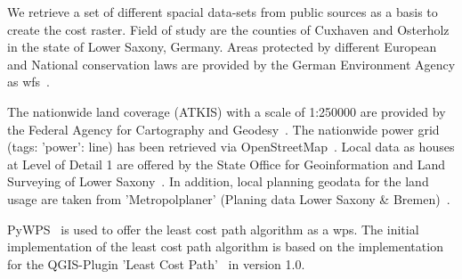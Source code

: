 
We retrieve a set of different spacial data-sets from  public sources as a basis to create the cost raster.
Field of study are the counties of Cuxhaven and Osterholz in the state of Lower Saxony, Germany.
Areas protected by different European and National conservation laws are provided by the German Environment Agency
as \acrfull{wfs}~\cite{noauthor_schutzgebiete_2015}.

The nationwide land coverage (ATKIS) with a scale of 1:250000 are provided by the Federal Agency for Cartography
and Geodesy~\cite{noauthor_digitales_2021}.
The nationwide power grid (tags: 'power': line) has been retrieved via OpenStreetMap~\cite{boeing_osmnx_2017}.
Local data as houses at Level of Detail 1 are offered by the State Office for Geoinformation and Land Surveying of
Lower Saxony~\cite{noauthor_opengeodatani_2022}.
In addition, local planning geodata for the land usage are taken
from 'Metropolplaner' (Planing data Lower Saxony \& Bremen)~\cite{noauthor_metropolplaner_2022}.

PyWPS~\cite{noauthor_welcome_2016} is used to offer the least cost path algorithm as a \acrfull{wps}.
The initial implementation of the least cost path algorithm is based on the implementation for the QGIS-Plugin
'Least Cost Path'~\cite{noauthor_leastcostpathdijkstra_algorithmpy_2022} in version 1.0.

